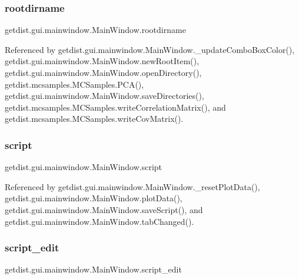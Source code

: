 \subsubsection{\texorpdfstring{rootdirname}{rootdirname}}
{\footnotesize\ttfamily getdist.\+gui.\+mainwindow.\+Main\+Window.\+rootdirname}



Referenced by getdist.\+gui.\+mainwindow.\+Main\+Window.\+\_\+update\+Combo\+Box\+Color(), getdist.\+gui.\+mainwindow.\+Main\+Window.\+new\+Root\+Item(), getdist.\+gui.\+mainwindow.\+Main\+Window.\+open\+Directory(), getdist.\+mcsamples.\+M\+C\+Samples.\+P\+C\+A(), getdist.\+gui.\+mainwindow.\+Main\+Window.\+save\+Directories(), getdist.\+mcsamples.\+M\+C\+Samples.\+write\+Correlation\+Matrix(), and getdist.\+mcsamples.\+M\+C\+Samples.\+write\+Cov\+Matrix().

\mbox{\label{classgetdist_1_1gui_1_1mainwindow_1_1MainWindow_a7ea253213a9b9be5120eeb8f8a2fb108}} 
\subsubsection{\texorpdfstring{script}{script}}
{\footnotesize\ttfamily getdist.\+gui.\+mainwindow.\+Main\+Window.\+script}



Referenced by getdist.\+gui.\+mainwindow.\+Main\+Window.\+\_\+reset\+Plot\+Data(), getdist.\+gui.\+mainwindow.\+Main\+Window.\+plot\+Data(), getdist.\+gui.\+mainwindow.\+Main\+Window.\+save\+Script(), and getdist.\+gui.\+mainwindow.\+Main\+Window.\+tab\+Changed().

\mbox{\label{classgetdist_1_1gui_1_1mainwindow_1_1MainWindow_a56a4c2779de79c0e1f53e978c7bd8185}} 
\subsubsection{\texorpdfstring{script\+\_\+edit}{script\_edit}}
{\footnotesize\ttfamily getdist.\+gui.\+mainwindow.\+Main\+Window.\+script\+\_\+edit}



